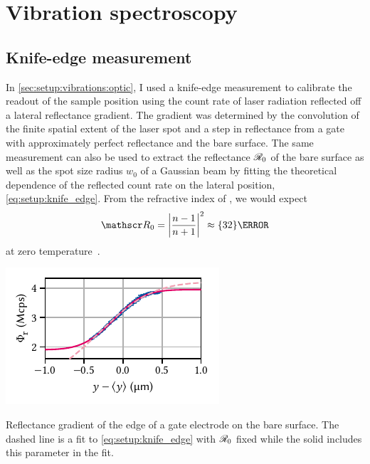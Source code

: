 \section{Vibration spectroscopy}\label{sec:app:setup:vibrations}
\subsection{Knife-edge measurement}\label{subsec:app:setup:vibrations:knife_edge}
In \cref{sec:setup:vibrations:optic}, I used a knife-edge measurement to calibrate the readout of the sample position using the count rate of laser radiation reflected off a lateral reflectance gradient.
The gradient was determined by the convolution of the finite spatial extent of the laser spot and a step in reflectance from a  gate with approximately perfect reflectance and the bare  surface.
The same measurement can also be used to extract the reflectance $\mathscr{R}_{0}$ of the bare  surface as well as the spot size radius $w_0$ of a Gaussian beam by fitting the theoretical dependence of the reflected count rate on the lateral position, \cref{eq:setup:knife_edge}.
From the refractive index of , we would expect
\begin{equation}
    \reflectance_0 = \abs{\frac{n-1}{n+1}}^2 \approx \qty{32}{\percent}
\end{equation}
at zero temperature~\cite{Talghader1995}.

\begin{marginfigure}
    \centering
    \includegraphics{img/pdf/setup/knife_edge_erf}
    \caption[]{
        Reflectance gradient of the edge of a  gate electrode on the bare  surface.
        The dashed line is a fit to \cref{eq:setup:knife_edge} with $\mathscr{R}_0$ fixed while the solid includes this parameter in the fit.
    }
    \label{fig:app:setup:vibrations:knife_edge}
\end{marginfigure}

